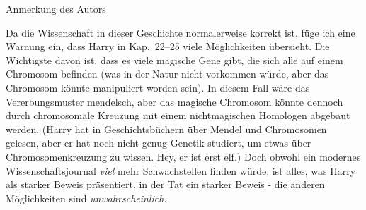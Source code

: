 \thispagestyle{empty}
{
\vspace*{6\baselineskip}
\itshape
\begin{center}
Anmerkung des Autors
\end{center}

Da die Wissenschaft in dieser Geschichte normalerweise korrekt ist, füge ich
eine Warnung ein, dass Harry in Kap.~22--25 viele Möglichkeiten übersieht. Die
Wichtigste davon ist, dass es viele magische Gene gibt, die sich alle auf einem
Chromosom befinden (was in der Natur nicht vorkommen würde, aber das Chromosom
könnte manipuliert worden sein). In diesem Fall wäre das Vererbungsmuster
mendelsch, aber das magische Chromosom könnte dennoch durch chromosomale
Kreuzung mit einem nichtmagischen Homologen abgebaut werden. (Harry hat in
Geschichtsbüchern über Mendel und Chromosomen gelesen, aber er hat noch nicht
genug Genetik studiert, um etwas über Chromosomenkreuzung zu wissen. Hey, er ist
erst elf.) Doch obwohl ein modernes Wissenschaftsjournal \emph{viel} mehr
Schwachstellen finden würde, ist alles, was Harry als starker Beweis
präsentiert, in der Tat ein starker Beweis - die anderen Möglichkeiten sind
\emph{unwahrscheinlich}.
}
